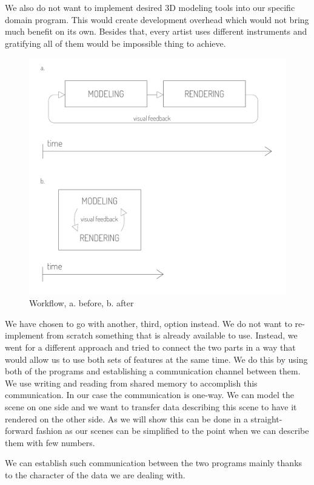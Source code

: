 \documentclass[
  digital, %
  table,   %
  nolof,     %
  nolot,     %
]{fithesis3}
\begin{document}
We also do not want to implement desired 3D modeling tools into our specific domain program. This would create development overhead which would not bring much benefit on its own. Besides that, every artist uses different instruments and gratifying all of them would be impossible thing to achieve.

\begin{figure}
  \centering
  \includegraphics[scale=0.7]{images/workflow-before-after.pdf}
  \caption{Workflow, a. before, b. after}
  \label{fig:workflow}
\end{figure}

We have chosen to go with another, third, option instead. We do not want to re-implement from scratch something that is already available to use. Instead, we went for a different approach and tried to connect the two parts in a way that would allow us to use both sets of features at the same time. We do this by using both of the programs and establishing a communication channel between them. We use writing and reading from shared memory to accomplish this communication. In our case the communication is one-way. We can model the scene on one side and we want to transfer data describing this scene to have it rendered on the other side. As we will show this can be done in a straight-forward fashion as our scenes can be simplified to the point when we can describe them with few numbers.

We can establish such communication between the two programs mainly thanks to the character of the data we are dealing with.
\end{document}
